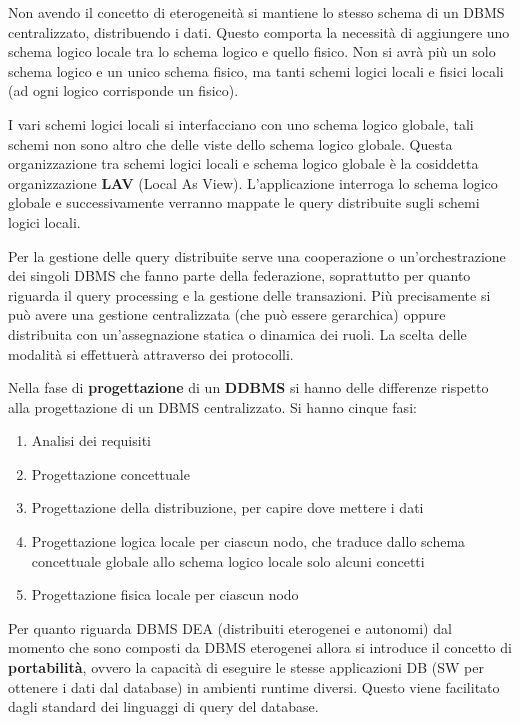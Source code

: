 Non avendo il concetto di eterogeneità si mantiene lo stesso schema di un DBMS
centralizzato, distribuendo i dati. Questo comporta la necessità di aggiungere
uno schema logico locale tra lo schema logico e quello fisico. Non si avrà più
un solo schema logico e un unico schema fisico, ma tanti schemi logici locali e
fisici locali (ad ogni logico corrisponde un fisico).

I vari schemi logici locali si interfacciano con uno schema logico globale,
tali schemi non sono altro che delle viste dello schema logico globale. Questa
organizzazione tra schemi logici locali e schema logico globale è la cosiddetta
organizzazione \textbf{LAV} (Local As View). L'applicazione interroga
lo schema logico globale e successivamente verranno mappate le query distribuite
sugli schemi logici locali.

Per la gestione delle query distribuite serve una cooperazione o un'orchestrazione
dei singoli DBMS che fanno parte della federazione, soprattutto per quanto riguarda
il query processing e la gestione delle transazioni. Più precisamente si può avere
una gestione centralizzata (che può essere gerarchica) oppure distribuita con
un'assegnazione statica o dinamica dei ruoli. La scelta delle modalità
si effettuerà attraverso dei protocolli.

Nella fase di \textbf{progettazione} di un \textbf{DDBMS} si hanno delle
differenze rispetto alla progettazione di un DBMS centralizzato. Si hanno cinque fasi:
\begin{enumerate}
      \item Analisi dei requisiti
      \item Progettazione concettuale
      \item Progettazione della distribuzione, per capire dove mettere i dati
      \item Progettazione logica locale per ciascun nodo, che traduce dallo schema
            concettuale globale allo schema logico locale solo alcuni concetti
      \item Progettazione fisica locale per ciascun nodo
\end{enumerate}
Per quanto riguarda DBMS DEA (distribuiti eterogenei e autonomi) dal momento che
sono composti da DBMS eterogenei allora si introduce il concetto di \textbf{portabilità},
ovvero la capacità di eseguire le stesse applicazioni DB (SW per ottenere i dati
dal database) in ambienti runtime diversi. Questo viene facilitato dagli standard
dei linguaggi di query del database.

